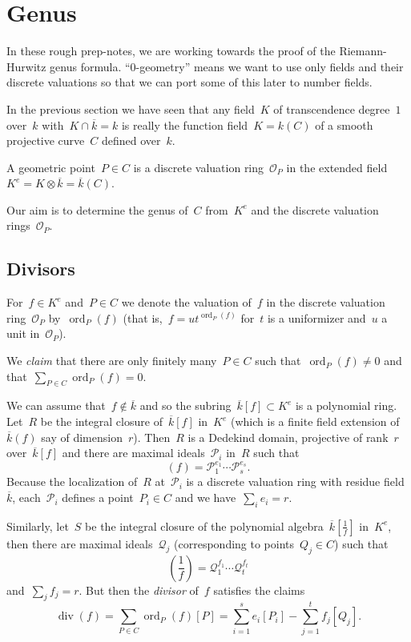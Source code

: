 \section{Genus}
\label{section:genus}
In these rough prep-notes, we are working towards the proof of the Riemann-Hurwitz genus formula. ``0-geometry'' means we want to use only fields and their discrete valuations so that we can port some of this later to number fields.

In the previous section we have seen that any field~$K$ of transcendence degree~$1$ over~$k$ with~$K \cap \overline{k} = k$ is really the function field~$K = k(C)$ of a smooth projective curve~$C$ defined over~$k$.

A geometric point~$P \in C$ is a discrete valuation ring~$\mathcal{O}_P$ in the extended field~$K^e = K \otimes \overline{k} = \overline{k}(C)$.

Our aim is to determine the genus of~$C$ from~$K^e$ and the discrete valuation rings~$\mathcal{O}_P$.

\subsection{Divisors}
For~$f \in K^e$ and~$P \in C$ we denote the valuation of~$f$ in the discrete valuation ring~$\mathcal{O}_P$ by~$\operatorname{ord}_P(f)$ (that is,~$f = u t^{\operatorname{ord}_P(f)}$ for~$t$ is a uniformizer and~$u$ a unit in~$\mathcal{O}_P$). 

We \emph{claim} that there are only finitely many~$P \in C$ such that~$\operatorname{ord}_P(f) \not= 0$ and that~$\sum_{P \in C} \operatorname{ord}_P(f) = 0$.

We can assume that~$f \notin \overline{k}$ and so the subring~$\overline{k}[f] \subset K^e$ is a polynomial ring. Let~$R$ be the integral closure of~$\overline{k}[f]$ in~$K^e$ (which is a finite field extension of~$\overline{k}(f)$ say of dimension~$r$). Then~$R$ is a Dedekind domain, projective of rank~$r$ over~$\overline{k}[f]$ and there are maximal ideals~$\mathcal{P}_i$ in~$R$ such that
\begin{equation}
  (f) = \mathcal{P}_1^{e_1} \cdots \mathcal{P}_s^{e_s}.
\end{equation}
Because the localization of~$R$ at~$\mathcal{P}_i$ is a discrete valuation ring with residue field~$\overline{k}$, each~$\mathcal{P}_i$ defines a point~$P_i \in C$ and we have~$\sum_i e_i = r$.

Similarly, let~$S$ be the integral closure of the polynomial algebra~$\overline{k}[\frac{1}{f}]$ in~$K^e$, then there are maximal ideals~$\mathcal{Q}_j$ (corresponding to points~$Q_j \in C$) such that
\begin{equation}
  \left(\frac{1}{f}\right) = \mathcal{Q}_1^{f_1} \cdots \mathcal{Q}_t^{f_t}
\end{equation}
and~$\sum_j f_j = r$. But then the \emph{divisor} of~$f$ satisfies the claims
\begin{equation}
  \operatorname{div}(f) = \sum_{P \in C} \operatorname{ord}_P(f) [P] = \sum_{i=1}^s e_i [P_i] - \sum_{j=1}^t f_j [Q_j].
\end{equation}


